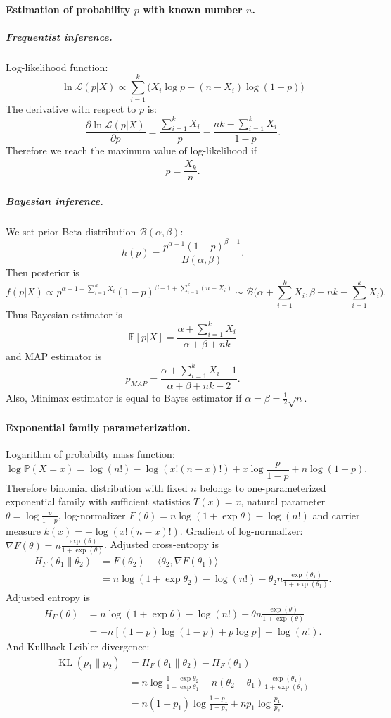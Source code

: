 \documentclass[a4paper,11pt]{article}
\theoremstyle{plain}
\theoremstyle{definition}
\newcommand{\MP}{\mathbb{P}}
\begin{document}
	\paragraph{Estimation of probability $p$ with known number $n$.}
	\subparagraph{Frequentist inference.} Log-likelihood function:
	\[
	\ln \mathcal{L}(p|X) \propto \sum_{i=1}^{k} \big(X_i \log p + (n-X_i) \log(1-p)\big)
	\]
	The derivative with respect to $p$ is:
	\[
	\frac{\partial \ln \mathcal{L}(p|X)}{\partial p} = \frac{\sum_{i=1}^k X_i}{p} - \frac{nk - \sum_{i=1}^{k}X_i}{1-p}.
	\]
	Therefore we reach the maximum value of log-likelihood if
	\[
	p = \frac{\overline X_k}{n}.
	\]
	
	\subparagraph{Bayesian inference.}
	We set prior Beta distribution $\mathcal{B}(\alpha, \beta)$:
	\[
	h(p) = \frac{p^{\alpha-1} (1-p)^{\beta - 1}}{B(\alpha, \beta)}.
	\]
	Then posterior is
	\[
	f(p|X) \propto p^{\alpha-1 + \sum_{i=1}^k X_i} (1-p)^{\beta - 1 + \sum_{i=1}^k (n - X_i)} \sim \mathcal{B}\bigg(\alpha + \sum_{i=1}^k X_i, \beta + nk - \sum_{i=1}^k X_i\bigg).
	\]
	Thus Bayesian estimator is
	\[ \mathbb{E}[p|X] = \frac{\alpha + \sum_{i=1}^k X_i}{\alpha + \beta + nk} \]
	and MAP estimator is
	\[ p_{MAP} = \frac{\alpha + \sum_{i=1}^k X_i - 1}{\alpha + \beta + nk - 2}. \]
	Also, Minimax estimator is equal to Bayes estimator if $\alpha = \beta = \frac{1}{2}\sqrt{n}$.
	
	\paragraph{Exponential family parameterization.}
	Logarithm of probabilty mass function:
	\[ \log \MP(X = x) = \log(n!) - \log(x!(n-x)!) + x \log \frac{p}{1-p} + n \log(1-p). \]
	Therefore binomial distribution with fixed $n$ belongs to one-parameterized exponential family with sufficient statistics $T(x) = x$, natural parameter $\theta = \log \frac{p}{1-p}$, log-normalizer $F(\theta) = n \log (1 + \exp \theta) - \log(n!)$ and carrier measure $k(x)=-\log(x!(n-x)!)$. Gradient of log-normalizer: $\nabla F(\theta) = n \frac{\exp(\theta)}{1+\exp(\theta)}$. Adjusted cross-entropy is
	\[ 
	\begin{aligned}
	H_F(\theta_1 \| \theta_2) & = F(\theta_2) - \langle \theta_2, \nabla F(\theta_1) \rangle \\
	& = n \log (1 + \exp \theta_2) - \log(n!) - \theta_2 n \frac{\exp(\theta_1)}{1+\exp(\theta_1)}.
	\end{aligned}
	\]
	Adjusted entropy is
	\[
	\begin{aligned}
	H_F(\theta) & = n \log (1 + \exp \theta) - \log(n!) - \theta n \frac{\exp(\theta)}{1+\exp(\theta)} \\
	& = -n[(1-p)\log(1-p) + p \log p] - \log(n!).
    \end{aligned}
	\]
	And Kullback-Leibler divergence:
	\[
	\begin{aligned}
	\operatorname{KL}(p_1 \| p_2) & = H_F(\theta_1 \| \theta_2) - H_F(\theta_1) \\
	& = n \log \frac{1+\exp \theta_2}{1+\exp \theta_1} - n (\theta_2 - \theta_1)\frac{\exp(\theta_1)}{1+\exp(\theta_1)} \\
	& = n(1-p_1)\log\frac{1-p_1}{1-p_2} + n p_1 \log\frac{p_1}{p_2}.
    \end{aligned}
	\]
	
\end{document}
